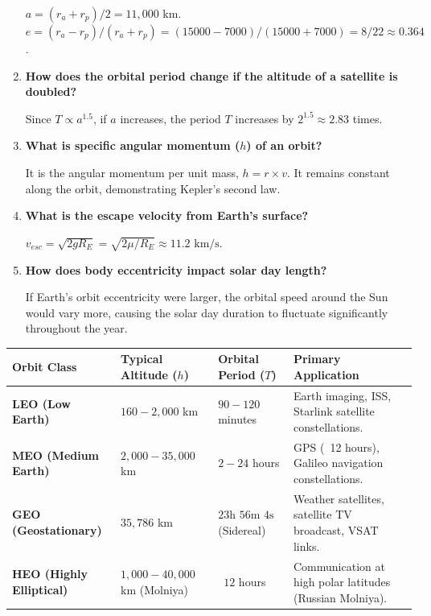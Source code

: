 \documentclass[12pt,a4paper]{article}
\newcommand{\Q}[1]{\textbf{#1}\par\noindent\ignorespaces}
\renewcommand{\arraystretch}{1.45}
\begin{document}
\begin{tcolorbox}[exambox, title={\textbf{Frequently Asked / Viva Questions}}]
\begin{enumerate}[topsep=0pt, label=\textbf{Q\arabic*.}, itemsep=5pt]
    $a = (r_a + r_p)/2 = 11,000$ km. $e = (r_a - r_p)/(r_a + r_p) = (15000-7000)/(15000+7000) = 8/22 \approx 0.364$.
  \item \Q{How does the orbital period change if the altitude of a satellite is doubled?}
    Since $T \propto a^{1.5}$, if $a$ increases, the period $T$ increases by $2^{1.5} \approx 2.83$ times.
  \item \Q{What is specific angular momentum ($h$) of an orbit?}
    It is the angular momentum per unit mass, $h = r \times v$. It remains constant along the orbit, demonstrating Kepler's second law.
  \item \Q{What is the escape velocity from Earth's surface?}
    $v_{esc} = \sqrt{2gR_E} = \sqrt{2\mu/R_E} \approx 11.2 \text{ km/s}$.
  \item \Q{How does body eccentricity impact solar day length?}
    If Earth's orbit eccentricity were larger, the orbital speed around the Sun would vary more, causing the solar day duration to fluctuate significantly throughout the year.
\end{enumerate}
\end{tcolorbox}

\begin{tcolorbox}[tikzbox, title={Comparison of Earth Orbit Altitudes}]
\renewcommand{\arraystretch}{1.4}
\par\noindent
{\renewcommand{\arraystretch}{1.55}%
\begin{tabularx}{\linewidth}{|B{3.2cm}|Y|Y|Y|}\hline
\textbf{Orbit Class} & \textbf{Typical Altitude ($h$)} & \textbf{Orbital Period ($T$)} & \textbf{Primary Application} \\[4pt]
\hline
\textbf{LEO (Low Earth)} & $160 - 2,000$ km & $90 - 120$ minutes & Earth imaging, ISS, Starlink satellite constellations. \\[4pt]
\hline
\textbf{MEO (Medium Earth)} & $2,000 - 35,000$ km & $2 - 24$ hours & GPS (~12 hours), Galileo navigation constellations. \\[4pt]
\hline
\textbf{GEO (Geostationary)} & $35,786$ km & $23\text{h }56\text{m }4\text{s}$ (Sidereal) & Weather satellites, satellite TV broadcast, VSAT links. \\[4pt]
\hline
\textbf{HEO (Highly Elliptical)} & $1,000 - 40,000$ km (Molniya) & ~$12$ hours & Communication at high polar latitudes (Russian Molniya). \\[4pt]
\hline
\end{tabularx}
}
\end{tcolorbox}
\end{document}

